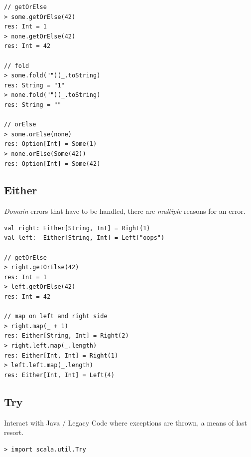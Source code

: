 \documentclass[10pt,landscape,a4paper]{article}
\begin{document}
\begin{multicols*}{4}
\begin{verbatim}
// getOrElse
> some.getOrElse(42)
res: Int = 1
> none.getOrElse(42)
res: Int = 42

// fold
> some.fold("")(_.toString)
res: String = "1"
> none.fold("")(_.toString)
res: String = ""

// orElse
> some.orElse(none)
res: Option[Int] = Some(1)
> none.orElse(Some(42))
res: Option[Int] = Some(42)

\end{verbatim}
  \subsection{Either}
  \begin{mdframed}
    \textit{Domain} errors that have to be handled, there are
    \textit{multiple} reasons for an error.
  \end{mdframed}
  \begin{center}
  \end{center}
\begin{verbatim}
val right: Either[String, Int] = Right(1)
val left:  Either[String, Int] = Left("oops")

// getOrElse
> right.getOrElse(42)
res: Int = 1
> left.getOrElse(42)
res: Int = 42

// map on left and right side
> right.map(_ + 1)
res: Either[String, Int] = Right(2)
> right.left.map(_.length)
res: Either[Int, Int] = Right(1)
> left.left.map(_.length)
res: Either[Int, Int] = Left(4)
\end{verbatim}
  \subsection{Try}
  \begin{mdframed}
    Interact with Java / Legacy Code where exceptions are thrown, a
    means of last resort.
  \end{mdframed}
  \begin{center}
  \end{center}
\begin{verbatim}
> import scala.util.Try


\end{verbatim}
\end{multicols*}
\end{document}
